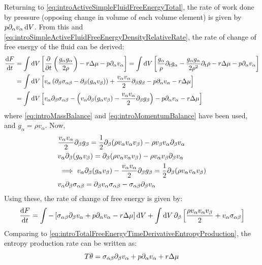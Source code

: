 Returning to \autoref{eq:introActiveSimpleFluidFreeEnergyTotal}, the rate of work done by pressure (opposing change in volume of each volume element) is given by $p\inlinePartial{\alpha}{v_\alpha} \dd{V}$. From this and \autoref{eq:introSimpleActiveFluidFreeEnergyDensityRelativeRate}, the rate of change of free energy of the fluid can be derived:
\begin{align*}
    \dv{F}{t} &= \int \dd{V} \left[\pdv{t}\left(\frac{g_\alpha g_\alpha}{2\rho}\right) - r\Delta\mu - p\inlinePartial{\alpha}{v_\alpha}\right] = \int \dd{V} \left[\frac{g_\alpha}{\rho}\inlinePartial{t}{g_\alpha} - \frac{g_\alpha g_\alpha}{2\rho^2}\inlinePartial{t}{\rho} - r\Delta\mu - p\inlinePartial{\alpha}{v_\alpha}\right]\\
    &= \int \dd{V} \left[v_\alpha\left(\inlinePartial{\beta}{\sigma_{\alpha\beta}} - \inlinePartial{\beta}{(g_\alpha v_\beta)}\right) + \frac{v_\alpha v_\alpha}{2}\inlinePartial{\beta}{g_\beta} - p\inlinePartial{\alpha}{v_\alpha}  - r\Delta\mu\right]\\
    &= \int \dd{V} \left[v_\alpha\inlinePartial{\beta}{\sigma_{\alpha\beta}} - \left(v_\alpha\inlinePartial{\beta}{(g_\alpha v_\beta)} - \frac{v_\alpha v_\alpha}{2}\inlinePartial{\beta}{g_\beta}\right) - p\inlinePartial{\alpha}{v_\alpha}  - r\Delta\mu\right]
\end{align*}
where \autoref{eq:introMassBalance} and \autoref{eq:introMomentumBalance} have been used, and $g_\alpha = \rho v_\alpha$. Now,
\begin{align*}
    &\frac{v_\alpha v_\alpha}{2}\inlinePartial{\beta}{g_\beta} = \frac{1}{2}\inlinePartial{\beta}{(\rho v_\alpha v_\alpha v_\beta)} - \rho v_\beta v_\alpha \inlinePartial{\beta}{v_\alpha}\\
    &v_\alpha\inlinePartial{\beta}{(g_\alpha v_\beta)} = \inlinePartial{\beta}{(\rho v_\alpha v_\alpha v_\beta)} - \rho v_\alpha v_\beta \inlinePartial{\beta}{v_\alpha}\\
    &\implies v_\alpha\inlinePartial{\beta}{(g_\alpha v_\beta)} - \frac{v_\alpha v_\alpha}{2}\inlinePartial{\beta}{g_\beta} = \frac{1}{2}\inlinePartial{\beta}{(\rho v_\alpha v_\alpha v_\beta)}\\
    &v_\alpha\inlinePartial{\beta}{\sigma_{\alpha\beta}} = \inlinePartial{\beta}{v_\alpha\sigma_{\alpha\beta}} - \sigma_{\alpha\beta}\inlinePartial{\beta}{v_\alpha}
\end{align*}
Using these, the rate of change of free energy is given by:
\begin{equation}\label{eq:introActiveSimpleFluidFreeEnergyRate}
    \dv{F}{t} = \int -\left[\sigma_{\alpha\beta}\inlinePartial{\beta}{v_\alpha} + p\inlinePartial{\alpha}{v_\alpha} - r\Delta\mu\right] \dd{V} + \int \dd{V} \inlinePartial{\beta}{\left[\frac{\rho v_\alpha v_\alpha v_\beta}{2} + v_\alpha \sigma_{\alpha\beta}\right]}
\end{equation}
Comparing to \autoref{eq:introTotalFreeEnergyTimeDerivativeEntropyProduction}, the entropy production rate can be written as:
\begin{equation}\label{eq:introActiveSimpleFluidEntropyProduction}
    T\theta = \sigma_{\alpha\beta}\inlinePartial{\beta}{v_\alpha} + p\inlinePartial{\alpha}{v_\alpha} + r\Delta\mu
\end{equation}


